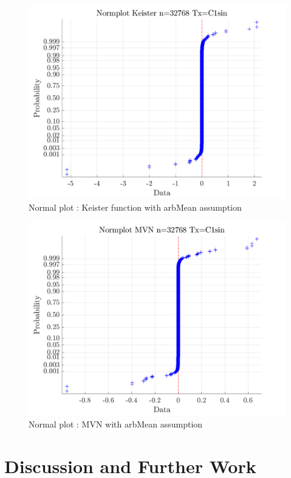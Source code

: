\documentclass[twocolumn]{svjour3}          %
\begin{document}
\begin{figure}
	\centering
	\includegraphics[width=0.9\linewidth]{"figures/arbMean/Keister/C1sin/Keister Normplot d_2 bernoulli_2 Period_C1sin n_32768"}
	\caption{Normal plot : Keister function with arbMean assumption}
	\label{fig:keister-normplot}
\end{figure}




\begin{figure}
	\centering
	\includegraphics[width=0.9\linewidth]{"figures/arbMean/MVN/C1sin/MVN Normplot d_2 bernoulli_2 Period_C1sin n_32768"}
	\caption{Normal plot : MVN with arbMean assumption}
	\label{fig:mvn-normplot}
\end{figure}

\fi




\section{Discussion and Further Work}
\end{document}
